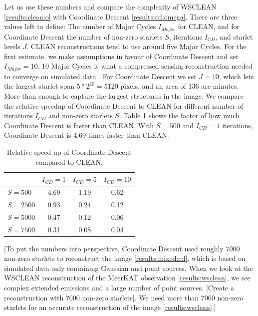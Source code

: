 Let us use these numbers and compare the complexity of WSCLEAN \eqref{results:clean:o} with Coordinate Descent \eqref{results:cd:omega}. There are three values left to define: The number of Major Cycles $I_{Major}$ for CLEAN, and for Coordinate Descent the  number of non-zero starlets $S$, iterations $I_{CD}$, and starlet levels $J$. CLEAN reconstructions tend to use around five Major Cycles. For the first estimate, we make assumptions in favour of Coordinate Descent and set $I_{Major} = 10$. 10 Major Cycles is what a compressed sensing reconstruction needed to converge on simulated data \cite{pratley2018fast}. For Coordinate Descent we set $J = 10$, which lets the largest starlet span $5*2^{10} = 5120$ pixels, and an area of 136 arc-minutes. More than enough to capture the largest structures in the image. We compare the relative speedup of Coordinate Descent to CLEAN for different number of iterations $I_{CD}$ and non-zero starlets $S$. Table \ref{res:cd:table} shows the factor of how much Coordinate Descent is faster than CLEAN. With $S=500$ and $I_{CD} = 1$ iterations, Coordinate Descent is 4.69 times faster than CLEAN. 

\begin{table}[h!]
	\begin{center}
		\begin{tabular}{l|c|c|c} %
			 & $I_{CD} = 1$ & $I_{CD} = 5$ &  $I_{CD} = 10$\\
			\hline
			$S=500$ & 4.69 &  1.19 & 0.62 \\
			$S=2500$ & 0.93 &  0.24 & 0.12 \\
			$S=5000$ & 0.47 &  0.12 & 0.06 \\
			$S=7500$ & 0.31 &  0.08 & 0.04 \\
		\end{tabular}
		\caption{Relative speed-up of Coordinate Descent compared to CLEAN. }
		\label{res:cd:table}
	\end{center}
\end{table}

[To put the numbers into perspective, Coordinate Descent used roughly 7000 non-zero starlets to reconstruct the image \ref{results:mixed:cd}, which is based on simulated data only containing Gaussian and point sources. When we look at the WSCLEAN reconstruction of the MeerKAT observation \ref{results:wsclean}, we see complex extended emissions and a large number of point sources. [Create a reconstruction with 7000 non-zero starlets]. We need more than 7000 non-zero starlets for an accurate reconstruction of the image \ref{results:wsclean}.]

